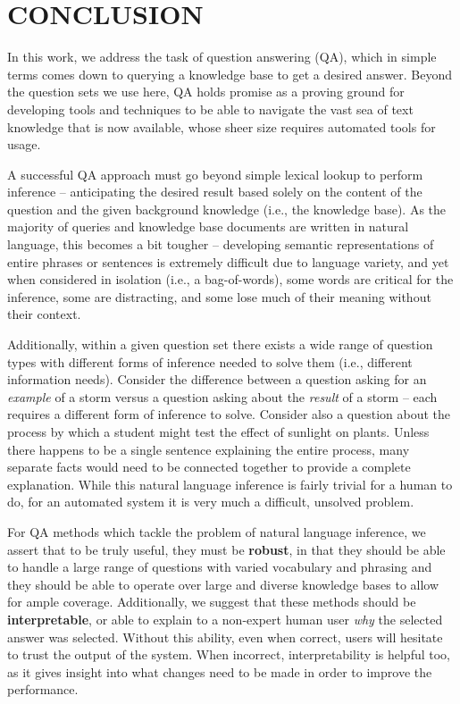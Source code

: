 \chapter{CONCLUSION\label{chapter:conclusion}}


In this work, we address the task of question answering (QA), which in simple terms comes down to querying a knowledge base to get a desired answer.  Beyond the question sets we use here, QA holds promise as a proving ground for developing tools and techniques to be able to navigate the vast sea of text knowledge that is now available, whose sheer size requires automated tools for usage.  

A successful QA approach must go beyond simple lexical lookup to perform inference -- anticipating the desired result based solely on the content of the question and the given background knowledge (i.e., the knowledge base).  As the majority of queries and knowledge base documents are written in natural language, this becomes a bit tougher --  
developing semantic representations of entire phrases or sentences is extremely difficult due to language variety, and yet when considered in isolation (i.e., a bag-of-words), some words are critical for the inference, some are distracting, and some lose much of their meaning without their context.  

Additionally, within a given question set there exists a wide range of question types with different forms of inference needed to solve them (i.e., different information needs).  Consider the difference between a question asking for an \textit{example} of a storm versus a question asking about the \textit{result} of a storm -- each requires a different form of inference to solve.  Consider also a question about the process by which a student might test the effect of sunlight on plants.  Unless there happens to be a single sentence explaining the entire process, many separate facts would need to be connected together to provide a complete explanation.  While this natural language inference is fairly trivial for a human to do, for an automated system it is very much a difficult, unsolved problem.

For QA methods which tackle the problem of natural language inference, we assert that to be truly useful, they must be \textbf{robust}, in that they should be able to handle a large range of questions with varied vocabulary and phrasing and they should be able to operate over large and diverse knowledge bases to allow for ample coverage.  Additionally, we suggest that these methods should be \textbf{interpretable}, or able to explain to a non-expert human user \textit{why} the selected answer was selected.  Without this ability, even when correct, users will hesitate to trust the output of the system.  When incorrect, interpretability is helpful too, as it gives insight into what changes need to be made in order to improve the performance.


